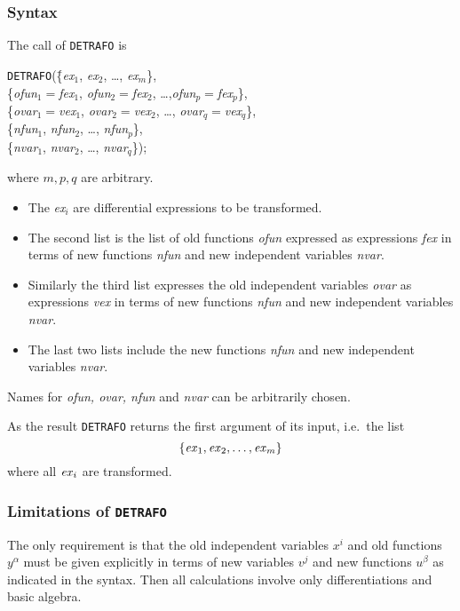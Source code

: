 \subsubsection{Syntax}
The call of {\tt DETRAFO} is
\begin{tabbing}
{\tt DETRAFO}(\=\{{\it ex}$_1$, {\it ex}$_2$, \ldots , {\it ex}$_m$\}, \\
              \>\{{\it ofun}$_1=${\it fex}$_1$, {\it ofun}$_2=${\it fex}$_2$,
               \ldots ,{\it ofun}$_p=${\it fex}$_p$\},  \\
              \>\{{\it ovar}$_1=${\it vex}$_1$, {\it ovar}$_2=${\it vex}$_2$, \ldots ,
                  {\it ovar}$_q=${\it vex}$_q$\},  \\
              \>\{{\it nfun}$_1$, {\it nfun}$_2$, \ldots , {\it nfun}$_p$\},\\
              \>\{{\it nvar}$_1$, {\it nvar}$_2$, \ldots , {\it nvar}$_q$\});
\end{tabbing}     
where $m,p,q$ are arbitrary.
\begin{itemize}
\item
The {\it ex}$_i$ are differential expressions to be transformed.
\item
The second list is the list of old functions {\it ofun} expressed
as expressions {\it fex} in terms
of new functions {\it nfun} and new independent variables {\it nvar}.
\item
Similarly the third list expresses the old independent variables {\it ovar}
as expressions {\it vex} in terms of new functions
{\it nfun} and new independent variables {\it nvar}.
\item
The last two lists include the new functions {\it nfun}
and new independent variables {\it nvar}.
\end{itemize}
Names for {\it ofun, ovar, nfun} and {\it nvar} can be arbitrarily
chosen.

As the result {\tt DETRAFO} returns the first argument of its input,
i.e.\ the list
\[\{{\it ex}_1, {\it ex}_2, \ldots , {\it ex}_m\}\]
where all ${\it ex}_i$ are transformed.
\subsubsection{Limitations of {\tt DETRAFO}}
The only requirement is that
the old independent variables $x^i$ and old functions $y^\alpha$ must be
given explicitly in terms of new variables $v^j$ and new functions $u^\beta$
as indicated in the syntax.
Then all calculations involve only differentiations and basic algebra.

